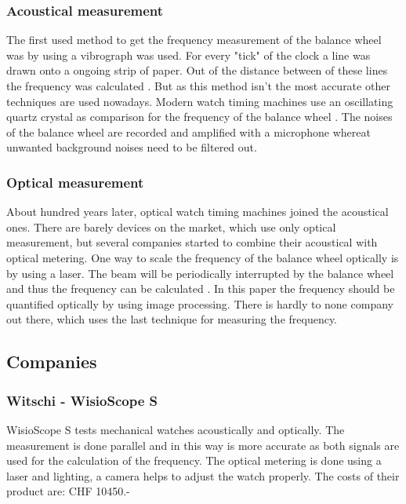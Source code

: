 \documentclass[12pt, a4paper]{report}
\begin{document}
    \subsubsection{Acoustical measurement}
    The first used method to get the frequency measurement of the balance wheel was by using a vibrograph was used. For every "tick" of the clock a line was drawn onto a ongoing strip of paper. Out of the distance between of these lines the frequency was calculated \cite{Zeitwaage}. But as this method isn't the most accurate other techniques are used nowadays.  
    Modern watch timing machines use an oscillating quartz crystal as comparison for the frequency of the balance wheel \cite{Zeitwaage}. The noises of the balance wheel are recorded and amplified with a microphone whereat unwanted background noises need to be filtered out. 
    
    \subsubsection{Optical measurement}
    About hundred years later, optical watch timing machines joined the acoustical ones. There are barely devices on the market, which use only optical measurement, but several companies started to combine their acoustical with optical metering. One way to scale the frequency of the balance wheel optically is by using a laser. The beam will be periodically interrupted by the balance wheel and thus the frequency can be calculated \cite{Lombardi2011}. In this paper the frequency should be quantified optically by using image processing. There is hardly to none company out there, which uses the last technique for measuring the frequency.
    
    \subsection{Companies}
    \subsubsection{Witschi - WisioScope S}
    WisioScope S tests mechanical watches acoustically and optically. The measurement is done parallel and in this way is more accurate as both signals are used for the calculation of the frequency.
    The optical metering is done using a laser and lighting, a camera helps to adjust the watch properly. The costs of their product are: CHF 10450.-
    
    \bigskip
    
\end{document}
